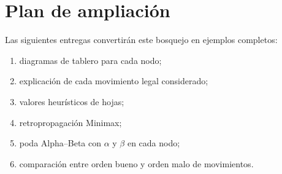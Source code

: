 \section{Plan de ampliación}

Las siguientes entregas convertirán este bosquejo en ejemplos completos:

\begin{enumerate}
\item diagramas de tablero para cada nodo;
\item explicación de cada movimiento legal considerado;
\item valores heurísticos de hojas;
\item retropropagación Minimax;
\item poda Alpha--Beta con $\alpha$ y $\beta$ en cada nodo;
\item comparación entre orden bueno y orden malo de movimientos.
\end{enumerate}
